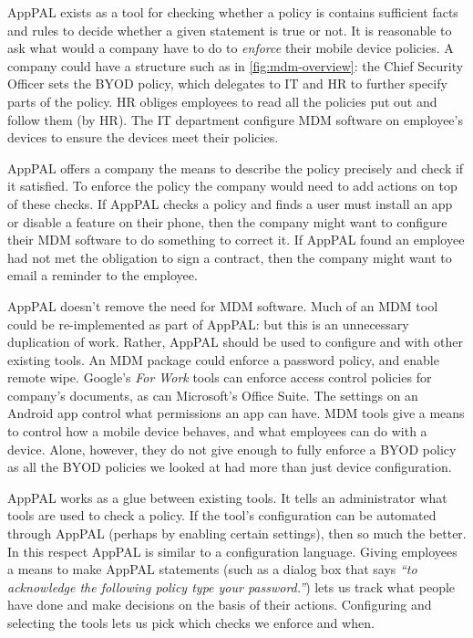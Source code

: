 \documentclass[thesis.tex]{subfiles}
\begin{document}
AppPAL exists as a tool for checking whether a policy is contains sufficient facts and rules to decide whether a given statement is true or not.
It is reasonable to ask what would a company have to do to
\emph{enforce} their mobile device policies. A company could have a
structure such as in \autoref{fig:mdm-overview}: the Chief Security
Officer sets the BYOD policy, which delegates to IT and HR to further
specify parts of the policy.  HR obliges employees to read all the
policies put out and follow them (by HR).  The IT department configure \ac{MDM} software on
employee's devices to ensure the devices meet their policies.

AppPAL offers a company the means to describe the policy precisely and check if
it satisfied. To enforce the policy the company would need to add actions on top
of these checks. If AppPAL checks a policy and finds a user must install an app
or disable a feature on their phone, then the company might want to configure
their \ac{MDM} software to do something to correct it. If AppPAL found an
employee had not met the obligation to sign a contract, then the company might
want to email a reminder to the employee.

AppPAL doesn't remove the need for \ac{MDM} software. Much of an \ac{MDM} tool
could be re-implemented as part of AppPAL: but this is an unnecessary
duplication of work. Rather, AppPAL should be used to configure and with other
existing tools. An \ac{MDM} package could enforce a password policy, and enable
remote wipe. Google's \emph{For Work} tools can enforce access control policies
for company's documents, as can Microsoft's Office Suite. The settings on an
Android app control what permissions an app can have. \ac{MDM} tools give a
means to control how a mobile device behaves, and what employees can do with a
device. Alone, however, they do not give enough to fully enforce a \ac{BYOD}
policy as all the \ac{BYOD} policies we looked at had more than just device
configuration.

AppPAL works as a glue between existing tools. It tells an administrator what
tools are used to check a policy. If the tool's configuration can be automated
through AppPAL (perhaps by enabling certain settings), then so much the better.
In this respect AppPAL is similar to a configuration language. Giving employees
a means to make AppPAL statements (such as a dialog box that says \emph{``to
acknowledge the following policy type your password.''}) lets us track what
people have done and make decisions on the basis of their actions. Configuring
and selecting the tools lets us pick which checks we enforce and when.

%  
\end{document}
